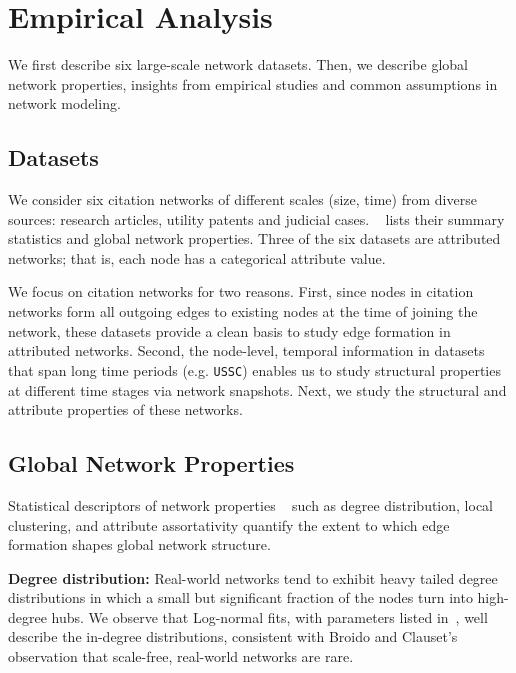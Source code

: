 
\section{Empirical Analysis}
\label{sec:Analysis}

We first describe six large-scale network datasets.
Then, we describe global network properties,
insights from empirical studies and common assumptions in
network modeling.

\subsection{Datasets}
\label{sec:Datasets}

We consider six citation networks of different scales (size, time) from diverse
sources: research articles, utility patents and judicial cases. ~ lists their
summary statistics and global network properties.  Three of the six datasets are attributed networks;
that is, each node has a categorical attribute value.

We focus on citation networks for two reasons. First, since nodes in citation networks form
all outgoing edges to existing nodes at the time of joining the network,
these datasets provide a clean basis to study edge formation in
attributed networks. Second, the node-level, temporal information in datasets that span long time periods (e.g. \texttt{USSC})
enables us to study structural properties at different time stages via network snapshots.
Next, we study the structural and attribute properties of these networks.

\subsection{Global Network Properties}
\label{subsec:factors}

Statistical descriptors of network properties ~\cite{newman2010networks}
such as degree distribution, local clustering, and attribute assortativity
quantify the extent to which edge formation shapes global network
structure.

\textbf{Degree distribution:}
Real-world networks tend to exhibit heavy tailed degree distributions in which
a small but significant fraction of the nodes turn into high-degree hubs.
We observe that Log-normal fits, with parameters listed in~, well describe
the in-degree distributions, consistent with Broido and
Clauset's~\cite{broido2018scale} observation that scale-free, real-world networks
are rare.

